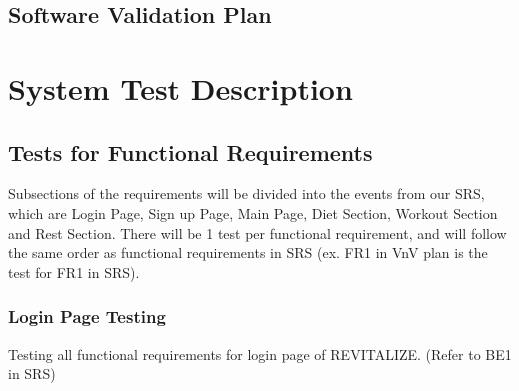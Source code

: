 \documentclass[12pt, titlepage]{article}
\begin{document}
\subsection{Software Validation Plan}


\section{System Test Description}
	
\subsection{Tests for Functional Requirements}

Subsections of the requirements will be divided into the events from our SRS, which are Login Page, Sign up Page, Main Page, Diet Section, Workout Section and Rest Section. There will be 1 test per functional requirement, and will follow the same order as functional requirements in SRS (ex. FR1 in VnV plan is the test for FR1 in SRS).

\subsubsection{Login Page Testing}

Testing all functional requirements for login page of REVITALIZE. (Refer to BE1 in SRS)
\end{document}
